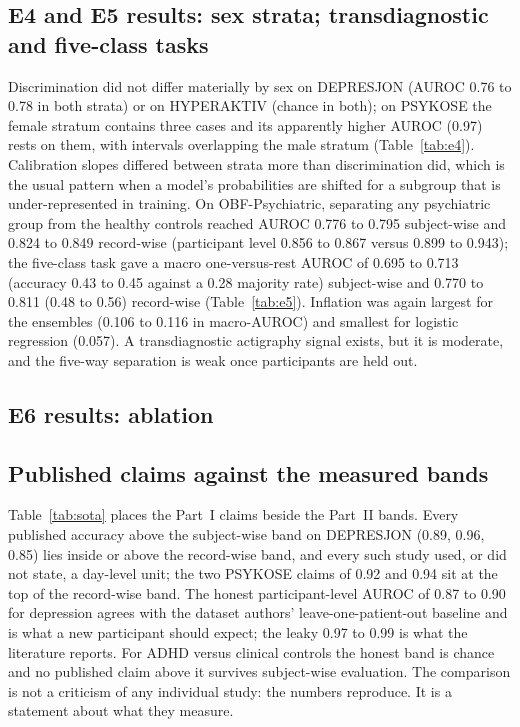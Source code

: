 \documentclass[11pt,a4paper]{article}
\begin{document}
\subsection{E4 and E5 results: sex strata; transdiagnostic and five-class tasks}


Discrimination did not differ materially by sex on DEPRESJON (AUROC 0.76 to 0.78 in both
strata) or on HYPERAKTIV (chance in both); on PSYKOSE the female stratum contains three cases and
its apparently higher AUROC (0.97) rests on them, with intervals overlapping the male stratum
(Table~\ref{tab:e4}). Calibration slopes differed between strata more than discrimination did,
which is the usual pattern when a model's probabilities are shifted for a subgroup that is
under-represented in training. On OBF-Psychiatric, separating any psychiatric group from the
healthy controls reached AUROC 0.776 to 0.795 subject-wise and 0.824 to 0.849 record-wise
(participant level 0.856 to 0.867 versus 0.899 to 0.943); the five-class task gave a macro
one-versus-rest AUROC of 0.695 to 0.713 (accuracy 0.43 to 0.45 against a 0.28 majority rate)
subject-wise and 0.770 to 0.811 (0.48 to 0.56) record-wise (Table~\ref{tab:e5}). Inflation was
again largest for the ensembles (0.106 to 0.116 in macro-AUROC) and smallest for logistic
regression (0.057). A transdiagnostic actigraphy signal exists, but it is moderate, and the
five-way separation is weak once participants are held out.

\subsection{E6 results: ablation}



\subsection{Published claims against the measured bands}

Table~\ref{tab:sota} places the Part~I claims beside the Part~II bands. Every published accuracy
above the subject-wise band on DEPRESJON (0.89, 0.96, 0.85) lies inside or above the record-wise
band, and every such study used, or did not state, a day-level unit; the two PSYKOSE claims of
0.92 and 0.94 sit at the top of the record-wise band. The honest participant-level AUROC of 0.87
to 0.90 for depression agrees with the dataset authors' leave-one-patient-out baseline
\cite{garciaceja2018} and is what a new participant should expect; the leaky 0.97 to 0.99 is
what the literature reports. For ADHD versus clinical controls the honest band is chance and no
published claim above it survives subject-wise evaluation. The comparison is not a criticism of
any individual study: the numbers reproduce. It is a statement about what they measure.
\end{document}
